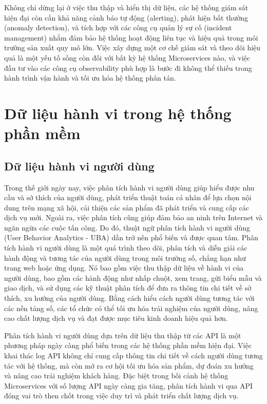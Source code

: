 \documentclass{uetgraduation}
\begin{document}
Không chỉ dừng lại ở việc thu thập và hiển thị dữ liệu, các hệ thống giám sát hiện đại còn cần khả năng cảnh báo tự động (alerting), phát hiện bất thường (anomaly detection), và tích hợp với các công cụ quản lý sự cố (incident management) nhằm đảm bảo hệ thống hoạt động liên tục và hiệu quả trong môi trường sản xuất quy mô lớn. Việc xây dựng một cơ chế giám sát và theo dõi hiệu quả là một yếu tố sống còn đối với bất kỳ hệ thống Microservices nào, và việc đầu tư vào các công cụ observability phù hợp là bước đi không thể thiếu trong hành trình vận hành và tối ưu hóa hệ thống phân tán.

\section{Dữ liệu hành vi trong hệ thống phần mềm}

\subsection{Dữ liệu hành vi người dùng}
Trong thế giới ngày nay, việc phân tích hành vi người dùng giúp hiểu được nhu cầu và sở thích của người dùng, phát triển thuật toán cá nhân để lựa chọn nội dung trên mạng xã hội, cải thiện các sản phẩm đã phát triển và cung cấp các dịch vụ mới. Ngoài ra, việc phân tích cũng giúp đảm bảo an ninh trên Internet và ngăn ngừa các cuộc tấn công. Do đó, thuật ngữ phân tích hành vi người dùng (User  Behavior  Analytics \cite{uba} - UBA) dần trở nên phổ biến và được quan tâm. Phân tích hành vi người dùng là một quá trình theo dõi, phân tích và diễn giải các hành động và tương tác của người dùng trong môi trường số, chẳng hạn như trang web hoặc ứng dụng. Nó bao gồm việc thu thập dữ liệu về hành vi của người dùng, bao gồm các hành động như nhấp chuột, xem trang, gửi biểu mẫu và giao dịch, và sử dụng các kỹ thuật phân tích để đưa ra thông tin chi tiết về sở thích, xu hướng của người dùng. Bằng cách hiểu cách người dùng tương tác với các nền tảng số, các tổ chức có thể tối ưu hóa trải nghiệm của người dùng, nâng cao chất lượng dịch vụ và đạt được mục tiêu kinh doanh hiệu quả hơn.

Phân tích hành vi người dùng dựa trên dữ liệu thu thập từ các API là một phương pháp ngày càng phổ biến trong các hệ thống phần mềm hiện đại. Việc khai thác log API không chỉ cung cấp thông tin chi tiết về cách người dùng tương tác với hệ thống, mà còn mở ra cơ hội tối ưu hóa sản phẩm, dự đoán xu hướng và nâng cao trải nghiệm khách hàng. Đặc biệt trong bối cảnh hệ thống Microservices với số lượng API ngày càng gia tăng, phân tích hành vi qua API đóng vai trò then chốt trong việc duy trì và phát triển chất lượng dịch vụ.
\end{document}
